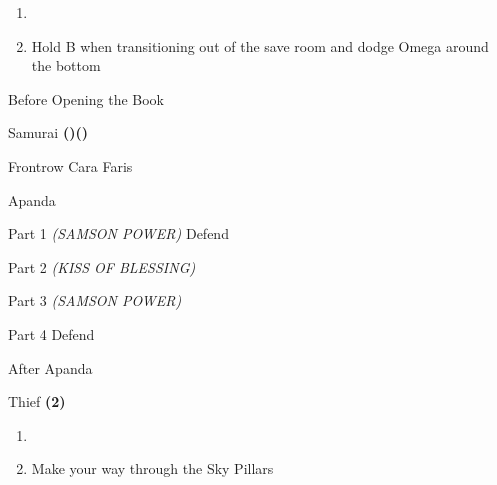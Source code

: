 \begin{paracol}{2}
\begin{enumerate}[resume]
    \item {}
    \item Hold B when transitioning out of the save room and dodge Omega around the bottom
\end{enumerate}

\begin{menu}{Before Opening the Book}
    \varwb
    \begin{jobMenu}
        \cara Samurai \textbf{(\pointLeft)(\pointDown)}
    \end{jobMenu}
    \begin{rowMenu}
        \caraFarisBartz Frontrow
        \swap Cara \switch Faris
    \end{rowMenu}
    \varwe
\end{menu}

\begin{boss}{Apanda}
    \varwb
    \begin{bossPart}{Part 1}
        \bartz[\bossHl{(1x)}] \rightCommand{\combine} \then \battleGroup{\revivify \space + \antidote} \textit{(SAMSON POWER)} \then {}
        \faris[\bossHl{(1x)}] \leftCommand{\drink} \then \speedDrink
         Defend
         \leftCommand{\guard}
    \end{bossPart}
    \begin{bossPart}{Part 2}
        \bartz[\bossHl{(1x)}] \rightCommand{\combine} \then \battleGroup{\revivify \space + \maidensKiss} \textit{(KISS OF BLESSING)} \then {}
    \end{bossPart}
    \begin{bossPart}{Part 3}
        \faris[\bossHl{(2x)}] \leftCommand{\drink} \then \heroDrink
        \bartz[\bossHl{(2x)}] \rightCommand{\combine} \then \battleGroup{\revivify \space + \antidote} \textit{(SAMSON POWER)} \then {}
    \end{bossPart}
    \begin{bossPart}{Part 4}
        \faris[\bossHl{(3x)}] \rightCommand{\gilToss}
         Defend
    \end{bossPart}
    \varwe
\end{boss}

\switchcolumnTwice[*]
\begin{menu}{After Apanda}
    \varwb
    \begin{jobMenu}
        \cara Thief \textbf{(2\pointRight)} \ability{!\gilToss}
    \end{jobMenu}
    \varwe
\end{menu}

\begin{enumerate}[resume]
    \item {}
    \item Make your way through the Sky Pillars
\end{enumerate}

\end{paracol}